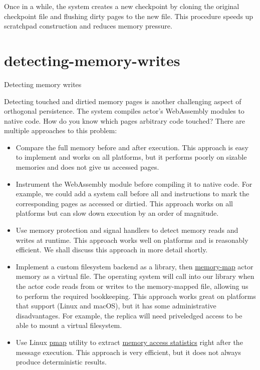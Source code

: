 \documentclass{article}
\begin{document}
Once in a while, the system creates a new checkpoint by cloning the original checkpoint file and flushing dirty pages to the new file.
This procedure speeds up scratchpad construction and reduces memory pressure.

\section{detecting-memory-writes}{Detecting memory writes}

Detecting touched and dirtied memory pages is another challenging aspect of orthogonal persistence.
The system compiles actor's WebAssembly modules to native code.
How do you know which pages arbitrary code touched? 
There are multiple approaches to this problem:
\begin{itemize}
  \item 
    Compare the full memory before and after execution.
    This approach is easy to implement and works on all platforms, but it performs poorly on sizable memories and does not give us accessed pages.
  \item 
    Instrument the WebAssembly module before compiling it to native code.
    For example, we could add a system call before all  and  instructions to mark the corresponding pages as accessed or dirtied.
    This approach works on all platforms but can slow down execution by an order of magnitude.
  \item 
    Use memory protection and signal handlers to detect memory reads and writes at runtime.
    This approach works well on  platforms and is reasonably efficient.
    We shall discuss this approach in more detail shortly.
  \item 
    Implement a custom filesystem backend as a \href{https://en.wikipedia.org/wiki/Filesystem_in_Userspace}{} library, then \href{https://man7.org/linux/man-pages/man2/mmap.2.html}{memory-map} actor memory as a virtual file.
    The operating system will call into our library when the actor code reads from or writes to the memory-mapped file, allowing us to perform the required bookkeeping.
    This approach works great on platforms that support  (Linux and macOS), but it has some administrative disadvantages.
    For example, the replica will need priveledged access to be able to mount a virtual filesystem.
  \item 
    Use Linux \href{https://man7.org/linux/man-pages/man1/pmap.1.html}{pmap} utility to extract \href{https://techtalk.intersec.com/2013/07/memory-part-2-understanding-process-memory/#pmap-detailed-mapping}{memory access statistics} right after the message execution.
    This approach is very efficient, but it does not always produce deterministic results.
\end{itemize}
\end{document}
